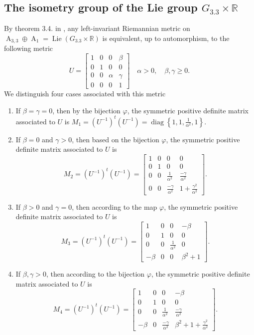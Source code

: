 \documentclass[12pt,a4paper,twoside]{article}
\theoremstyle{definition}
\begin{document}
\subsection{The isometry group of the Lie group $G_{3.3} \times \mathbb{R}$}
By theorem 3.4. in \cite{aitbenhaddou2025classification}, any left-invariant Riemannian metric on $\operatorname{A}_{3, 3} \oplus \operatorname{A}_1 = \operatorname{Lie}(G_{3.3} \times \mathbb{R})$ is equivalent, up to automorphism, to the following metric
$$U = \begin{bmatrix}
1 & 0 & 0 & \beta\\
0 & 1 & 0 & 0\\
0 & 0 & \alpha & \gamma\\
0 & 0 & 0 & 1
\end{bmatrix} \quad \alpha > 0, \quad \beta, \gamma \geq 0.$$
We distinguish four cases associated with this metric
\begin{enumerate}
\item If $\beta = \gamma = 0$, then by the bijection $\varphi$, the symmetric positive definite matrix associated to $U$ is $M_1 = (U^{-1})^t(U^{-1}) = \operatorname{diag}\left\lbrace 1, 1, \frac{1}{\alpha^2}, 1\right\rbrace$.
\item If $\beta = 0$ and $\gamma > 0$, then based on the bijection $\varphi$, the symmetric positive definite matrix associated to $U$ is
$$M_2 = (U^{-1})^t(U^{-1}) = \begin{bmatrix}
1 & 0 & 0 & 0\\
0 & 1 & 0 & 0\\
0 & 0 & \frac{1}{\alpha^2} & \frac{-\gamma}{\alpha^2}\\
0 & 0 & \frac{-\gamma}{\alpha^2} & 1 + \frac{\gamma^2}{\alpha^2}
\end{bmatrix}.$$
\item If $\beta > 0$ and $\gamma = 0$, then according to the map $\varphi$, the symmetric positive definite matrix associated to $U$ is
$$M_3 = (U^{-1})^t(U^{-1}) = \begin{bmatrix}
1 & 0 & 0 & -\beta\\
0 & 1 & 0 & 0\\
0 & 0 & \frac{1}{\alpha^2} & 0\\
-\beta & 0 & 0 & \beta^2 + 1
\end{bmatrix}.$$
\item If $\beta, \gamma > 0$, then according to the bijection $\varphi$, the symmetric positive definite matrix associated to $U$ is 
$$M_4 = (U^{-1})^t(U^{-1}) = \begin{bmatrix}
1 & 0 & 0 & -\beta\\
0 & 1 & 0 & 0\\
0 & 0 & \frac{1}{\alpha^2} & \frac{-\gamma}{\alpha^2}\\
-\beta & 0 & \frac{-\gamma}{\alpha^2} & \beta^2 + 1 + \frac{\gamma^2}{\alpha^2}
\end{bmatrix}.$$
\end{enumerate}
\end{document}
